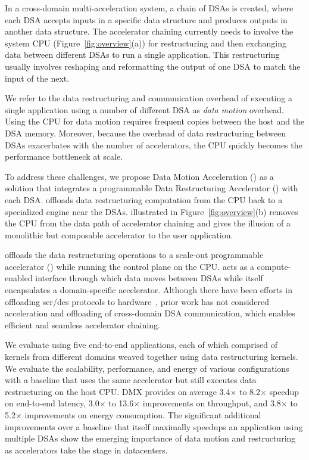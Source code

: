 In a cross-domain multi-acceleration system, a chain of DSAs is created, where each DSA accepts inputs in a specific data structure and produces outputs in another data structure. 
%
The accelerator chaining currently needs to involve the system CPU (Figure~\ref{fig:overview}(a)) for restructuring and then exchanging data between different DSAs to run a single application.
%
This restructuring usually involves reshaping and reformatting the output of one DSA to match the input of the next.
%

We refer to the data restructuring and communication overhead of executing a single application using a number of different DSA as \textit{data motion} overhead. %
%
Using the CPU for data motion requires frequent copies between the host and the DSA memory. 
%
Moreover, because the overhead of data restructuring between DSAs exacerbates with the number of accelerators, the CPU quickly becomes the performance bottleneck at scale.

To address these challenges, we propose Data Motion Acceleration (\dmx) as a solution that integrates a programmable Data Restructuring Accelerator (\drx) with each DSA.
%
\drx offloads data restructuring computation from the CPU back to a specialized engine near the DSAs.
%
\dmx illustrated in Figure~\ref{fig:overview}(b) removes the CPU from the data path of accelerator chaining and gives the illusion of a monolithic but composable accelerator to the user application. 

\dmx offloads the data restructuring operations to a scale-out programmable accelerator (\drx) while running the control plane on the CPU. 
%
\drx acts as a compute-enabled interface through which data moves between DSAs while \drx itself encapsulates a domain-specific accelerator. Although there have been efforts in offloading ser/des protocols to hardware~\cite{optimusprime:asplos:2020,karandikar-2021-protobuf}, prior work has not considered acceleration and offloading of cross-domain DSA communication, which enables efficient and seamless accelerator chaining.

We evaluate \dmx using five end-to-end applications, each of which comprised of kernels from different domains weaved together using data restructuring  kernels. 
%
%
We evaluate the scalability, performance, and energy of various \dmx configurations with a baseline that uses the same accelerator but still executes data restructuring on the host CPU.
%
DMX provides on average 3.4$\times$ to 8.2$\times$ speedup on end-to-end latency, 3.0$\times$ to 13.6$\times$ improvements on throughput, and 3.8$\times$ to 5.2$\times$ improvements on energy consumption.
%
The significant additional improvements over a baseline that itself maximally speedups an application using multiple DSAs show the emerging importance of data motion and restructuring as accelerators take the stage in datacenters.
